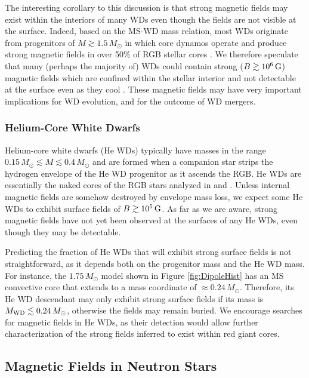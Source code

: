 The interesting corollary to this discussion is that strong magnetic fields may exist within the interiors of many WDs even though the fields are not visible at the surface. Indeed, based on the MS-WD mass relation, most WDs originate from progenitors of $M \gtrsim 1.5 \, M_\odot$ in which core dynamos operate and produce strong magnetic fields in over 50\% of RGB stellar cores \citep{Stello_2016}. We therefore speculate that many (perhaps the majority of) WDs could contain strong ($B \gtrsim 10^6 \, {\rm G}$) magnetic fields which are confined within the stellar interior and not detectable at the surface even as they cool \citep[$t_{\rm Ohm} \sim 10^{11}$ yrs in WDs interiors,][]{Cumming_2003}. These magnetic fields may have very important implications for WD evolution, and for the outcome of WD mergers. 


\subsubsection{Helium-Core White Dwarfs}

Helium-core white dwarfs (He WDs) typically have masses in the range $0.15 \, M_\odot \lesssim M \lesssim 0.4 \, M_\odot$ and are formed when a companion star strips the hydrogen envelope of the He WD progenitor as it ascends the RGB. He WDs are essentially the naked cores of the RGB stars analyzed in \cite{Fuller_2015} and \cite{Stello_2016}. Unless internal magnetic fields are somehow destroyed by envelope mass loss, we expect some He WDs to exhibit surface fields of $B \gtrsim 10^5 \, {\rm G}$. As far as we are aware, strong magnetic fields have not yet been observed at the surfaces of any He WDs, even though they may be detectable.

Predicting the fraction of He WDs that will exhibit strong surface fields is not straightforward, as it depends both on the progenitor mass and the He WD mass. For instance, the $1.75 \, M_\odot$ model shown in Figure \ref{fig:DipoleHist} has an MS convective core that extends to a mass coordinate of $\approx 0.24 \, M_\odot$. Therefore, its He WD descendant may only exhibit strong surface fields if its mass is $M_{\rm WD} \lesssim 0.24 \, M_\odot$, otherwise the fields may remain buried. We encourage searches for magnetic fields in He WDs, as their detection would allow further characterization of the strong fields inferred to exist within red giant cores.



\subsection{Magnetic Fields in Neutron Stars}

